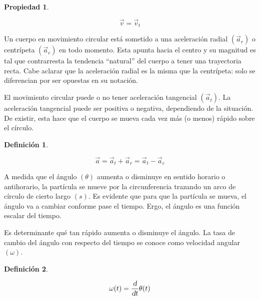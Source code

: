 \documentclass[a5paper,12pt,twoside]{book}
\newtheorem{defn}{{Definición}}[chapter]
\newtheorem{prop}{{Propiedad}}[chapter]
\begin{document}
\begin{mdframed}[style=MyFrame1]
    \begin{prop}
        \label{prop:circularMovVel}
    \end{prop}
    \begin{equation*}
        \Vec{v} = \Vec{v}_t
    \end{equation*}
\end{mdframed}

Un cuerpo en movimiento circular está sometido a una aceleración radial $(\vec{a}_r)$ o centrípeta $(\Vec{a}_c)$ en todo momento. Esta apunta hacia el centro y su magnitud es tal que contrarresta la tendencia ``natural'' del cuerpo a tener una trayectoria recta. Cabe aclarar que la aceleración radial es la misma que la centrípeta: solo se diferencian por ser opuestas en su notación.

El movimiento circular puede o no tener aceleración tangencial $(\Vec{a}_ t)$. La aceleración tangencial puede ser positiva o negativa, dependiendo de la situación. De existir, esta hace que el cuerpo se mueva cada vez más (o menos) rápido sobre el círculo.

\begin{mdframed}[style=MyFrame1]
    \begin{defn}
    \end{defn}
    \begin{equation*}
        \Vec{a} = \Vec{a}_t + \Vec{a}_r = \Vec{a}_t - \Vec{a}_c
    \end{equation*}
\end{mdframed}

A medida que el ángulo $(\theta)$ aumenta o disminuye en sentido horario o antihorario, la partícula se mueve por la circunferencia trazando un arco de círculo de cierto largo $(s)$. Es evidente que para que la partícula se mueva, el ángulo va a cambiar conforme pase el tiempo. Ergo, el ángulo es una función escalar del tiempo.

Es determinante qué tan rápido aumenta o disminuye el ángulo. La tasa de cambio del ángulo con respecto del tiempo se conoce como velocidad angular $(\omega)$.

\begin{mdframed}[style=MyFrame1]
    \begin{defn}
        \label{defn:angularVel}
    \end{defn}
    \begin{equation*}
        \omega (t) = \dfrac{\textsl{d}}{\textsl{d} t} \theta (t)
    \end{equation*}
\end{mdframed}
\end{document}
